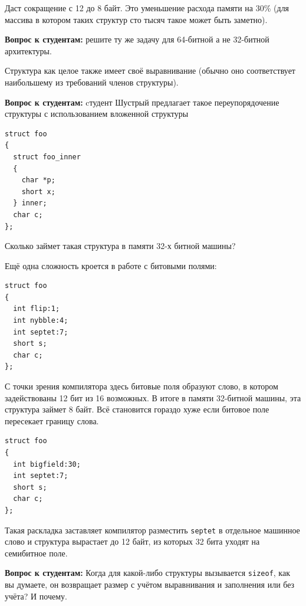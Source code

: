 \documentclass[a4paper,12pt,oneside]{article}
\newif\ifanswers
\begin{document}
Даст сокращение с 12 до 8 байт. Это уменьшение расхода памяти на 30\% (для массива в котором таких структур сто тысяч такое может быть заметно).

\textbf{Вопрос к студентам:} решите ту же задачу для 64-битной а не 32-битной архитектуры.

\ifanswers
Правильный ответ: теперь указатель будет 8 байт и скоращение с 24 до 16 -- те же 30\%
\fi

Структура как целое также имеет своё выравнивание (обычно оно соответствует наибольшему из требований членов структуры).

\textbf{Вопрос к студентам:} cтудент Шустрый предлагает такое переупорядочение структуры с использованием вложенной структуры

\begin{lstlisting}
struct foo 
{
  struct foo_inner 
  {
    char *p;
    short x;
  } inner;
  char c;
};
\end{lstlisting}

Сколько займет такая структура в памяти 32-х битной машины?

\ifanswers
Ответ: выравнивание внутренней структуры получается 2, а выравнивание внешней структуры 7. Несложный подсчет показывает, что используется целых 16 байт. Немыслимо много. Поэтому с вложенными структурами надо быть осторожней.
\fi

Ещё одна сложность кроется в работе с битовыми полями:

\begin{lstlisting}
struct foo 
{
  int flip:1;
  int nybble:4;
  int septet:7;
  short s;
  char c;
};
\end{lstlisting}

С точки зрения компилятора здесь битовые поля образуют слово, в котором задействованы 12 бит из 16 возможных. В итоге в памяти 32-битной машины, эта структура займет 8 байт. Всё становится гораздо хуже если битовое поле пересекает границу слова.

\begin{lstlisting}
struct foo 
{
  int bigfield:30;
  int septet:7;
  short s;
  char c;
};
\end{lstlisting}

Такая раскладка заставляет компилятор разместить \lstinline!septet! в отдельное машинное слово и структура вырастает до 12 байт, из которых 32 бита уходят на семибитное поле.

\textbf{Вопрос к студентам:} Когда для какой-либо структуры вызывается \lstinline!sizeof!, как вы думаете, он возвращает размер с учётом выравнивания и заполнения или без учёта? И почему.
\end{document}
